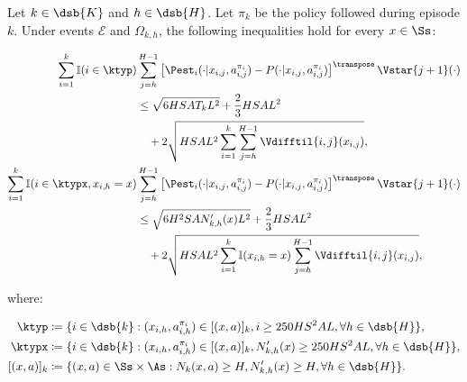 
\begin{lemma}
\label{lem:sum_c}
Let $k \in \dsb{K}$ and $h \in \dsb{H}$. Let $\pi_k$ be the policy followed during episode $k$. Under events $\mathcal{E}$ and $\Omega_{k,h}$, the following inequalities hold for every $x \in \Ss$:

\begin{align}
    \begin{split}
    \label{lem:sum_c:1}
        \sum_{i=1}^k \mathbb{I}(i \in \ktyp) &\sum_{j=h}^{H-1} \left[ \Pest_i(\cdot | x_{i,j}, a_{i,j}^{\pi_i}) - P(\cdot | x_{i,j}, a_{i,j}^{\pi_i}) \right]^\transpose \Vstar{j+1}(\cdot) \\
        &\le \sqrt{6 H S A T_k L^2} + \frac{2}{3} HSAL^2 \\
        &\quad + 2\sqrt{H S A L^2 \sum_{i=1}^k \sum_{j=h}^{H-1} \Vdifftil{i,j}(x_{i,j})},
    \end{split} \\
    \begin{split}
    \label{lem:sum_c:2}
        \sum_{i=1}^k \mathbb{I}(i \in \ktypx, x_{i,h}=x) &\sum_{j=h}^{H-1} \left[ \Pest_i(\cdot | x_{i,j}, a_{i,j}^{\pi_i}) - P(\cdot | x_{i,j}, a_{i,j}^{\pi_i}) \right]^\transpose \Vstar{j+1}(\cdot) \\
        &\le \sqrt{6 H^2 S A N'_{k,h}(x) L^2} + \frac{2}{3} HSAL^2 \\
        &\quad + 2\sqrt{H S A L^2 \sum_{i=1}^k \mathbb{I}(x_{i,h}=x) \sum_{j=h}^{H-1} \Vdifftil{i,j}(x_{i,j})},
    \end{split}
\end{align}

where:

\begin{align*}
    \ktyp &\coloneqq \{ i\in\dsb{k} : (x_{i,h}, a_{i,h}^{\pi_i}) \in [(x,a)]_k, i \ge 250 H S^2 A L, \forall h \in \dsb{H} \}, \\
    \ktypx &\coloneqq \{ i \in \dsb{k} : (x_{i,h}, a_{i,h}^{\pi_i}) \in [(x,a)]_k, N'_{k,h}(x) \ge 250 H S^2 A L, \forall h \in \dsb{H} \}, \\
    [(x,a)]_k &\coloneqq \{ (x,a) \in \Ss \times \As : N_k (x,a) \ge H, N'_{k,h}(x) \ge H, \forall h \in \dsb{H} \}.
\end{align*}
\end{lemma}

